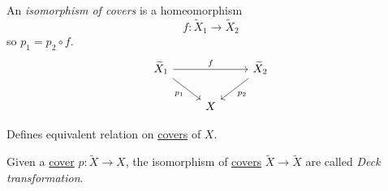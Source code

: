 \begin{definition}[Covers]\label{def:covers}
	An \emph{isomorphism of covers} is a homeomorphism
	\[
		f\colon \widetilde{X} _1\to \widetilde{X} _2
	\]
	so \(p_1 = p_2\circ f\).
	\[\begin{tikzcd}
			{\widetilde{X}_1} && {\widetilde{X}_2} \\
			& X
			\arrow["{p_1}"', from=1-1, to=2-2]
			\arrow["{p_2}", from=1-3, to=2-2]
			\arrow["f", from=1-1, to=1-3]
		\end{tikzcd}\]
\end{definition}

\begin{exercise}
	Defines equivalent relation on \hyperref[def:covers]{covers} of \(X\).
\end{exercise}

\begin{definition}\label{def:deck-transformation}
	Given a \hyperref[def:covers]{cover} \(p\colon \widetilde{X} \to X\), the isomorphism of \hyperref[def:covers]{covers}
	\(\widetilde{X} \to \widetilde{X} \) are called \emph{Deck transformation}.
\end{definition}